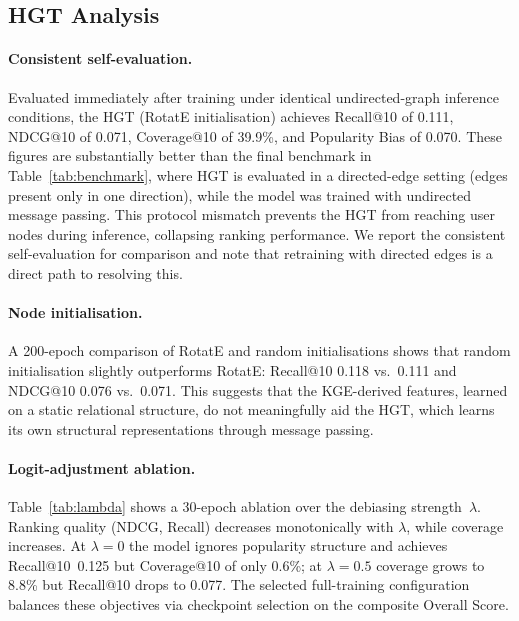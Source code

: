 \subsection{HGT Analysis}
\label{sec:hgt_analysis}

\paragraph{Consistent self-evaluation.} Evaluated immediately after training under identical undirected-graph inference conditions, the HGT (RotatE initialisation) achieves Recall@10 of 0.111, NDCG@10 of 0.071, Coverage@10 of 39.9\%, and Popularity Bias of 0.070. These figures are substantially better than the final benchmark in Table~\ref{tab:benchmark}, where HGT is evaluated in a directed-edge setting (edges present only in one direction), while the model was trained with undirected message passing. This protocol mismatch prevents the HGT from reaching user nodes during inference, collapsing ranking performance. We report the consistent self-evaluation for comparison and note that retraining with directed edges is a direct path to resolving this.

\paragraph{Node initialisation.} A 200-epoch comparison of RotatE and random initialisations shows that random initialisation slightly outperforms RotatE: Recall@10 0.118 vs.\ 0.111 and NDCG@10 0.076 vs.\ 0.071. This suggests that the KGE-derived features, learned on a static relational structure, do not meaningfully aid the HGT, which learns its own structural representations through message passing.

\paragraph{Logit-adjustment ablation.} Table~\ref{tab:lambda} shows a 30-epoch ablation over the debiasing strength~$\lambda$. Ranking quality (NDCG, Recall) decreases monotonically with $\lambda$, while coverage increases. At $\lambda{=}0$ the model ignores popularity structure and achieves Recall@10~0.125 but Coverage@10 of only 0.6\%; at $\lambda{=}0.5$ coverage grows to 8.8\% but Recall@10 drops to 0.077. The selected full-training configuration balances these objectives via checkpoint selection on the composite Overall Score.

